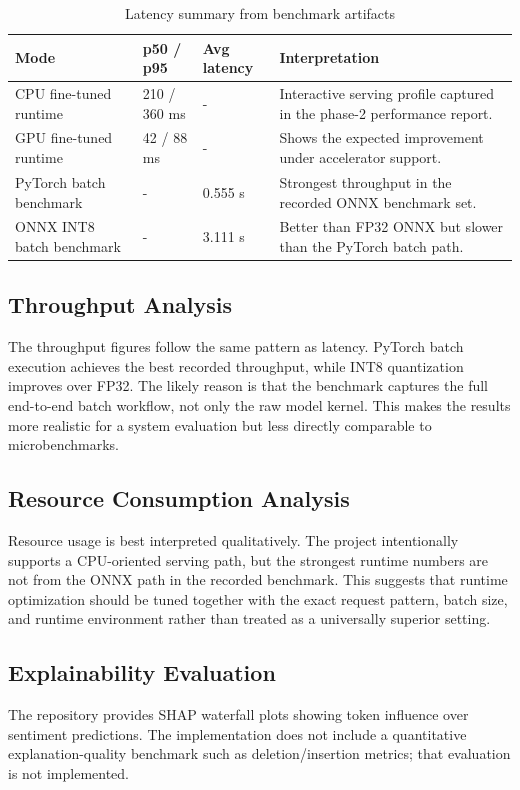 \documentclass[12pt, a4paper]{article}
\begin{document}
\begin{table}[H]
\centering
\caption{Latency summary from benchmark artifacts}
\begin{tabularx}{\textwidth}{@{} p{2.5cm} p{2.5cm} p{2.7cm} X @{}}
\toprule
\textbf{Mode} & \textbf{p50 / p95} & \textbf{Avg latency} & \textbf{Interpretation} \\
\midrule
CPU fine-tuned runtime & 210 / 360 ms & - & Interactive serving profile captured in the phase-2 performance report. \\
GPU fine-tuned runtime & 42 / 88 ms & - & Shows the expected improvement under accelerator support. \\
PyTorch batch benchmark & - & 0.555 s & Strongest throughput in the recorded ONNX benchmark set. \\
ONNX INT8 batch benchmark & - & 3.111 s & Better than FP32 ONNX but slower than the PyTorch batch path. \\
\bottomrule
\end{tabularx}
\end{table}

\subsection{Throughput Analysis}
The throughput figures follow the same pattern as latency. PyTorch batch execution achieves the best recorded throughput, while INT8 quantization improves over FP32. The likely reason is that the benchmark captures the full end-to-end batch workflow, not only the raw model kernel. This makes the results more realistic for a system evaluation but less directly comparable to microbenchmarks.

\subsection{Resource Consumption Analysis}
Resource usage is best interpreted qualitatively. The project intentionally supports a CPU-oriented serving path, but the strongest runtime numbers are not from the ONNX path in the recorded benchmark. This suggests that runtime optimization should be tuned together with the exact request pattern, batch size, and runtime environment rather than treated as a universally superior setting.

\subsection{Explainability Evaluation}
The repository provides SHAP waterfall plots showing token influence over sentiment predictions. The implementation does not include a quantitative explanation-quality benchmark such as deletion/insertion metrics; that evaluation is not implemented.
\end{document}
